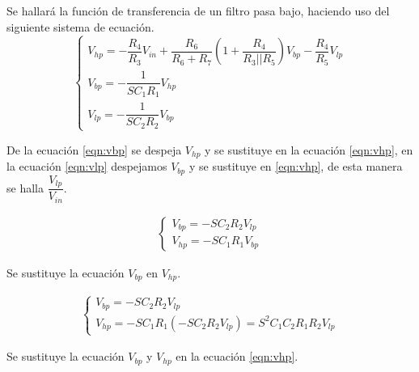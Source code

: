 \begin{enumerate}
            Se hallará la función de transferencia de un filtro pasa bajo, haciendo uso del siguiente sistema de ecuación.
            \begin{equation*}
                \begin{cases}
                    V_{hp}= -\dfrac{R_4}{R_3}V_{in} + \dfrac{R_6}{R_6+R_7}\left(1+\dfrac{R_4}{R_3||R_5}\right)V_{bp}-\dfrac{R_4}{R_5}V_{lp}\\[0.5cm]
                    V_{bp}=-\dfrac{1}{SC_1R_1}V_{hp}\\[0.5cm]
                    V_{lp}=-\dfrac{1}{SC_2R_2}V_{bp}
                \end{cases}
            \end{equation*}

            De la ecuación \ref{eqn:vbp} se despeja $V_{hp}$ y se sustituye en la ecuación \ref{eqn:vhp}, en la ecuación \ref{eqn:vlp} despejamos $V_{bp}$ y se sustituye en \ref{eqn:vhp}, de esta manera se halla $\dfrac{V_{lp}}{V_{in}}$.

            \begin{gather*}
                \begin{cases}
                    V_{bp}=-SC_2R_2V_{lp}\\[0.5cm]
                    V_{hp}=-SC_1R_1V_{bp}
                \end{cases}
            \end{gather*}

            Se sustituye la ecuación $V_{bp}$ en $V_{hp}$.

            \begin{gather*}
                \begin{cases}
                    V_{bp}=-SC_2R_2V_{lp}\\[0.5cm]
                    V_{hp}=-SC_1R_1(-SC_2R_2V_{lp})=S^2C_1C_2R_1R_2V_{lp} 
                \end{cases}
            \end{gather*}

            Se sustituye la ecuación $V_{bp}$ y $V_{hp}$ en la ecuación \ref{eqn:vhp}.
            

\end{enumerate}
